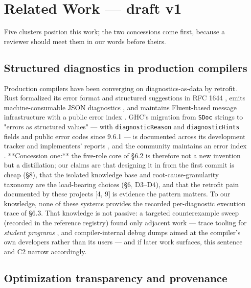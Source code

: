 \section{Related Work --- draft v1}
\label{sec:related}

Five clusters position this work; the two concessions come first,
because a reviewer should meet them in our words before theirs.

\subsection{Structured diagnostics in production compilers}

Production compilers have been converging on diagnostics-as-data by
retrofit. Rust formalized its error format and structured
suggestions in RFC 1644 \cite{rust-rfc1644}, emits machine-consumable JSON
diagnostics \cite{rustc-json}, and maintains Fluent-based message infrastructure
with a public error index \cite{rustc-dev-guide}. GHC's migration from \texttt{SDoc} strings
to "errors as structured values" --- with \texttt{diagnosticReason} and
\texttt{diagnosticHints} fields and public error codes since 9.6.1 --- is
documented across its development tracker and implementers' reports
\cite{ghc-structured-errors,welltyped2021ghc}, and the community maintains an error index \cite{haskell-error-index}. **Concession
one:** the five-role core of \S6.2 is therefore not a new invention
but a distillation; our claims are that designing it in from the
first commit is cheap (\S8), that the isolated knowledge base and
root-cause-granularity taxonomy are the load-bearing choices (\S6,
D3--D4), and that the retrofit pain documented by these projects [4,
9] is evidence the pattern matters. To our knowledge, none of these systems
provides the recorded per-diagnostic execution trace of \S6.3. That
knowledge is not passive: a targeted counterexample sweep (recorded
in the reference registry) found only adjacent work --- trace tooling
for \emph{student programs} \cite{suzuki2017tracediff}, and compiler-internal debug dumps
aimed at the compiler's own developers rather than its users --- and
if later work surfaces, this sentence and C2 narrow accordingly.

\subsection{Optimization transparency and provenance}

